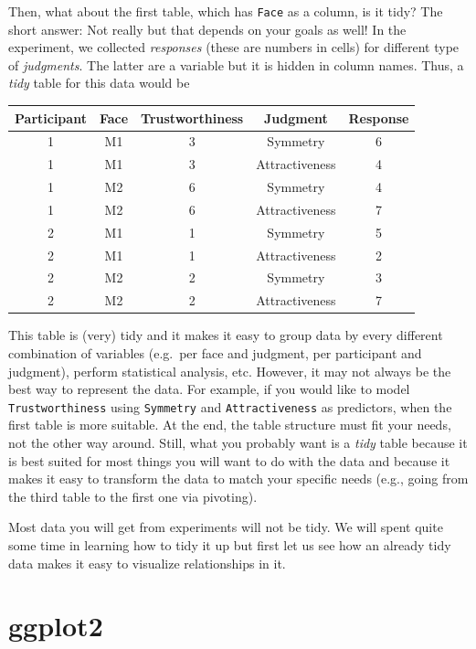 \documentclass[
]{book}
\begin{document}
Then, what about the first table, which has \texttt{Face} as a column, is it tidy? The short answer: Not really but that depends on your goals as well! In the experiment, we collected \emph{responses} (these are numbers in cells) for different type of \emph{judgments}. The latter are a variable but it is hidden in column names. Thus, a \emph{tidy} table for this data would be

\begin{tabular}{c|c|c|c|c}
\hline
Participant & Face & Trustworthiness & Judgment & Response\\
\hline
1 & M1 & 3 & Symmetry & 6\\
\hline
1 & M1 & 3 & Attractiveness & 4\\
\hline
1 & M2 & 6 & Symmetry & 4\\
\hline
1 & M2 & 6 & Attractiveness & 7\\
\hline
2 & M1 & 1 & Symmetry & 5\\
\hline
2 & M1 & 1 & Attractiveness & 2\\
\hline
2 & M2 & 2 & Symmetry & 3\\
\hline
2 & M2 & 2 & Attractiveness & 7\\
\hline
\end{tabular}

This table is (very) tidy and it makes it easy to group data by every different combination of variables (e.g.~per face and judgment, per participant and judgment), perform statistical analysis, etc. However, it may not always be the best way to represent the data. For example, if you would like to model \texttt{Trustworthiness} using \texttt{Symmetry} and \texttt{Attractiveness} as predictors, when the first table is more suitable. At the end, the table structure must fit your needs, not the other way around. Still, what you probably want is a \emph{tidy} table because it is best suited for most things you will want to do with the data and because it makes it easy to transform the data to match your specific needs (e.g., going from the third table to the first one via pivoting).

Most data you will get from experiments will not be tidy. We will spent quite some time in learning how to tidy it up but first let us see how an already tidy data makes it easy to visualize relationships in it.

\hypertarget{ggplot2-1}{%
\section{ggplot2}\label{ggplot2-1}}
\end{document}

